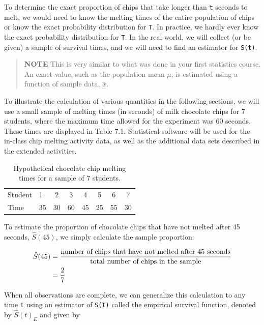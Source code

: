 \documentclass[
]{report}
\begin{document}
To determine the exact proportion of chips that take longer than \texttt{t} seconds to melt, we would need to know the melting times of the entire population of chips or know the exact probability distribution for \texttt{T}. In practice, we hardly ever know the exact probability distribution for \texttt{T}. In the real world, we will collect (or be given) a sample of survival times, and we will need to find an estimator for \texttt{S(t)}.

\begin{quote}
\textbf{NOTE} This is very similar to what was done in your first statistics course. An exact value, such as the population mean \(\mu\), is estimated using a function of sample data, \(\bar x\).
\end{quote}

To illustrate the calculation of various quantities in the following sections, we will use a small sample of melting times (in seconds) of milk chocolate chips for 7 students, where the maximum time allowed for the experiment was 60 seconds. These times are displayed in Table 7.1. Statistical software will be used for the in-class chip melting activity data, as well as the additional data sets described in the extended activities.

\begin{table}[!h]
\centering
\caption{\label{tab:tab91}Hypothetical chocolate chip melting times for a sample of 7 students.}
\centering
\begin{tabular}[t]{llcccccc}
\toprule
  &  &  &  &  &  &  & \\
\midrule
Student & 1 & 2 & 3 & 4 & 5 & 6 & 7\\
Time & 35 & 30 & 60 & 45 & 25 & 55 & 30\\
\bottomrule
\end{tabular}
\end{table}

To estimate the proportion of chocolate chips that have not melted after 45 seconds, \(\scriptstyle \hat S(45)\), we simply calculate the sample proportion:

\begin{align}
\hat S(45) &= \frac{\text{number of chips that have not melted after 45 seconds}}{\text{total number of chips in the sample}} \notag \\
&= \frac{2}{7} \notag
\end{align}

When all observations are complete, we can generalize this calculation to any time \texttt{t} using an estimator of \texttt{S(t)} called the empirical survival function, denoted by \(\scriptstyle \hat S(t)_{E}\) and given by
\end{document}
